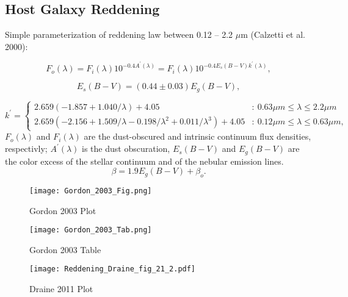 \documentclass[12pt,letterpaper]{article}
\begin{document}
\subsection*{Host Galaxy Reddening}
Simple parameterization of reddening law between 0.12 -- 2.2 $\mu$m (Calzetti et al. 2000):

\begin{equation}F_o(\lambda) = F_i(\lambda)10^{-0.4A^\prime(\lambda)} = F_i(\lambda)10^{-0.4E_s(B-V)k^\prime(\lambda)},   \end{equation}

\begin{equation} E_s(B-V) = (0.44\pm0.03)E_g(B-V),  \end{equation}

\[ 
k^\prime = 
	\begin{cases}
	2.659(-1.857+1.040/\lambda) + 4.05  & :~0.63 \mu m \leq \lambda \leq 2.2\mu m \\
	2.659(-2.156+1.509/\lambda - 0.198/\lambda^2 + 0.011/\lambda^3) + 4.05 & :~0.12 \mu m \leq \lambda \leq 0.63\mu m,
	\end{cases}
\]
$F_o(\lambda)$ and $F_i(\lambda)$ are the dust-obscured and intrinsic continuum flux densities, respectivly; $A^\prime(\lambda)$ is the dust obscuration, $E_s(B-V)$ and $E_g(B-V)$ are the color excess of the stellar continuum and of the nebular emission lines.
\begin{equation} \beta = 1.9E_g(B-V)+\beta_o.  \end{equation}

\begin{figure}[htbp] %
   \centering
   \texttt{[image: Gordon\_2003\_Fig.png]} 
   \caption{Gordon 2003 Plot}
   \label{fig:Gordonplot}
\end{figure}
\begin{figure}[htbp] %
   \centering
   \texttt{[image: Gordon\_2003\_Tab.png]} 
   \caption{Gordon 2003 Table}
   \label{fig:Gordonplot}
\end{figure}
\begin{figure}[htbp] %
   \centering
   \texttt{[image: Reddening\_Draine\_fig\_21\_2.pdf]} 
   \caption{Draine 2011 Plot}
   \label{fig:Gordonplot}
\end{figure}
\end{document}
